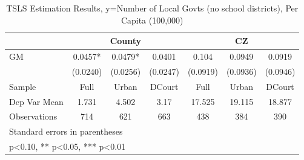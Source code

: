 \begin{table}[htbp]\centering
\def\sym#1{\ifmmode^{#1}\else\(^{#1}\)\fi}
\caption{TSLS Estimation Results, y=Number of Local Govts (no school districts), Per Capita (100,000)}
\begin{tabular}{l*{6}{c}}
\toprule
                &\multicolumn{3}{c}{County}            &\multicolumn{3}{c}{CZ}                \\\cmidrule(lr){2-4}\cmidrule(lr){5-7}
\midrule
GM              &   0.0457*  &   0.0479*  &   0.0401   &    0.104   &   0.0949   &   0.0919   \\
                & (0.0240)   & (0.0256)   & (0.0247)   & (0.0919)   & (0.0936)   & (0.0946)   \\
\midrule
Sample          &     Full   &    Urban   &   DCourt   &     Full   &    Urban   &   DCourt   \\
Dep Var Mean    &    1.731   &    4.502   &     3.17   &   17.525   &   19.115   &   18.877   \\
Observations    &      714   &      621   &      663   &      438   &      384   &      390   \\
\bottomrule
\multicolumn{7}{l}{\footnotesize Standard errors in parentheses}\\
\multicolumn{7}{l}{\footnotesize * p<0.10, ** p<0.05, *** p<0.01}\\
\end{tabular}
\end{table}
